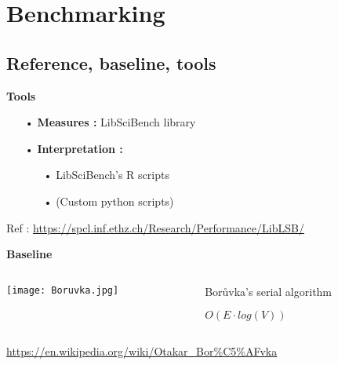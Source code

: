 \documentclass{beamer}
\begin{document}

\section{Benchmarking}
\subsection{Reference, baseline, tools}
\begin{frame}

\textbf{\Large Tools} 

\begin{itemize}
\item[•] \textbf{Measures :} LibSciBench library
\item[•] \textbf{Interpretation :} 
\begin{itemize}
\item[•] LibSciBench's R scripts
\item[•] (Custom python scripts)
\end{itemize}
\end{itemize}

{
\tiny
Ref : 
\url{https://spcl.inf.ethz.ch/Research/Performance/LibLSB/}
}

\vfill

\textbf{\Large Baseline}

\begin{columns}
\begin{column}{0.3\linewidth}
\begin{center}
\texttt{[image: Boruvka.jpg]}
\end{center}
\end{column}
\begin{column}{0.7\linewidth}
\begin{center}
Borůvka's serial algorithm

$O(E \cdot log(V))$
\end{center}
\end{column}
\end{columns}
{\tiny \url{https://en.wikipedia.org/wiki/Otakar_Bor\%C5\%AFvka}}



\end{frame}
\end{document}
